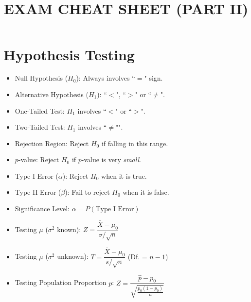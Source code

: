 \documentclass[%
 aip,
 jmp,%
 amsmath,amssymb,
 reprint,%
]{revtex4-1}
\begin{document}
\title[STAT7055 - INTRODUCTORY STATISTICS FOR BUSINESS AND FINANCE]{EXAM CHEAT SHEET (PART II)}
\maketitle


\section{Hypothesis Testing}

\begin{itemize}[label={}]
\item Null Hypothesis ($H_0$): Always involves ``$=$" sign.
\item Alternative Hypothesis ($H_1$): ``$<$", ``$>$" or ``$\neq$".
\item One-Tailed Test: $H_1$ involves ``$<$" or ``$>$".
\item Two-Tailed Test: $H_1$ involves ``$\neq$"".
\item Rejection Region: Reject $H_0$ if falling in this range.
\item $p$-value: Reject $H_0$ if $p$-value is very \textit{small}.
\item Type I Error ($\alpha$): Reject $H_0$ when it is true.
\item Type II Error ($\beta$): Fail to reject $H_0$ when it is false.
\item Significance Level: $\alpha=P(\textrm{Type I Error})$
\item Testing $\mu$ ($\sigma^2$ known): $Z=\dfrac{\bar{X}-\mu_0}{\sigma/\sqrt{n}}$
\item Testing $\mu$ ($\sigma^2$ unknown): $T=\dfrac{\bar{X}-\mu_0}{s/\sqrt{n}}$ {\small (Df. = $n-1$)} 
\item Testing Population Proportion $p$: $Z=\dfrac{\hat{p}-p_0}{\sqrt{\frac{p_0(1-p_0)}{n}}}$
\end{itemize}
\end{document}
